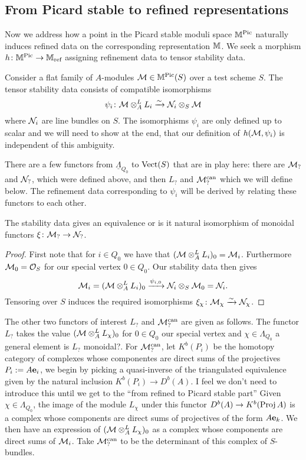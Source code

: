 \documentclass[12pt]{amsart}
\begin{document}
\subsection{From Picard stable to refined representations}
Now we address how a point in the Picard stable moduli space $\mathbb{M}^{\operatorname{Pic}}$ naturally induces refined data on the corresponding representation $\mathbb{M}$.
We seek a morphism $h \colon \mathbb{M}^{\operatorname{Pic}} \to \mathbb{M}_{\text{ref}}$ assigning refinement data to tensor stability data.

Consider a flat family of $A$-modules $\mathcal{M} \in \mathbb{M}^{\operatorname{Pic}}(S)$ over a test scheme $S$.
The tensor stability data consists of compatible isomorphisms 
$$\psi_i \colon \mathcal{M} \otimes_A^L L_i \xrightarrow{\sim} \mathcal{N}_i \otimes_S \mathcal{M}$$
where $\mathcal{N}_i$ are line bundles on $S$. 
The isomorphisms $\psi_i$ are only defined up to scalar and we will need to show at the end, that our definition of $h(\mathcal{M},\psi_i)$ is independent of this ambiguity.

There are a few functors from $\underline{\Lambda}_{Q_0}$ to $\operatorname{Vect}(S)$ that are in play here: there are $\mathcal{M}_?$ and $\mathcal{N}_?$, which were defined above, and then $L_?$ and $\mathcal{M}_?^{\text{can}}$ which we will define below.
The refinement data corresponding to $\psi_i$ will be derived by relating these functors to each other.

\begin{lemma}\label{lm:equivNM}
The stability data gives an equivalence {\red or is it natural isomorphism} of monoidal functors  $\xi \colon \mathcal{M}_? \rightarrow \mathcal{N}_?$.
\end{lemma}

\begin{proof}
First note that for $i\in Q_0$ we have that $(\mathcal{M} \otimes_A^L L_i)_0 = \mathcal{M}_i$.
Furthermore $\mathcal{M}_0 = \mathcal{O}_S$ for our special vertex $0\in Q_0$.
Our stability data then gives
$$\mathcal{M}_i = (\mathcal{M} \otimes_A^L L_i)_0 \xrightarrow{\psi_{i,0}} \mathcal{N}_i \otimes_S \mathcal{M}_0 = \mathcal{N}_i.$$
Tensoring over $S$ induces the required isomorphisms $\xi_\chi \colon \mathcal{M}_\chi \xrightarrow{\sim} \mathcal{N}_\chi$.
\end{proof}

The other two functors of interest $L_?$ and $\mathcal{M}_?^{\text{can}}$ are given as follows.
The functor $L_?$ takes the value  $(\mathcal{M} \otimes_A^L L_\chi)_0$ for $0 \in Q_0$ our special vertex and $\chi \in \Lambda_{Q_0}$ a general element {\red is $L_?$ monoidal?}.
For $\mathcal{M}_?^{\text{can}}$, let $K^b(P_i)$ be the homotopy category of complexes whose componentes are direct sums of the projectives $P_i := A\mathbf{e}_i$, we begin by picking a quasi-inverse of the triangulated equivalence given by the natural inclusion $K^b(P_i) \rightarrow D^b(A)$. {\red I feel we don't need to introduce this until we get to the ``from refined to Picard stable part''} 
Given $\chi \in \Lambda_{Q_0}$, the image of the module $L_\chi$ under this functor $D^b(A) \rightarrow K^b(\operatorname{Proj} A)$ is a complex whose components are direct sums of projectives of the form $A\mathbf{e}_k$.
We then have an expression of $(\mathcal{M} \otimes_A^L L_\chi)_0$ as a complex whose components are direct sums of $\mathcal{M}_i$.
Take $\mathcal{M}_?^{\text{can}}$ to be the determinant of this complex of $S$-bundles.
\end{document}
